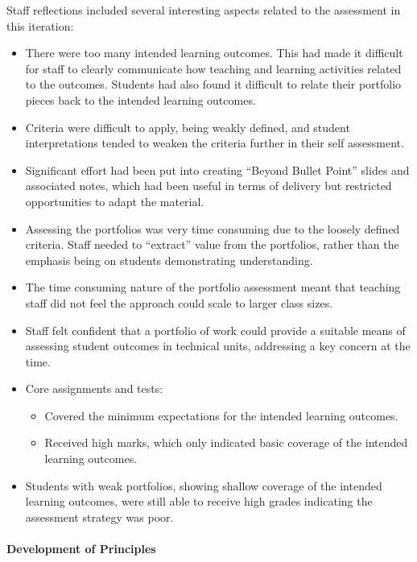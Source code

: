 Staff reflections included several interesting aspects related to the assessment in this iteration:
\begin{itemize}[noitemsep,nolistsep]
  \item There were too many intended learning outcomes. This had made it difficult for staff to clearly communicate how teaching and learning activities related to the outcomes. Students had also found it difficult to relate their portfolio pieces back to the intended learning outcomes.
  \item Criteria were difficult to apply, being weakly defined, and student interpretations tended to weaken the criteria further in their self assessment.
  \item Significant effort had been put into creating ``Beyond Bullet Point'' slides and associated notes, which had been useful in terms of delivery but restricted opportunities to adapt the material.
  \item Assessing the portfolios was very time consuming due to the loosely defined criteria. Staff needed to ``extract'' value from the portfolios, rather than the emphasis being on students demonstrating understanding.
  \item The time consuming nature of the portfolio assessment meant that teaching staff did not feel the approach could scale to larger class sizes.
  \item Staff felt confident that a portfolio of work could provide a suitable means of assessing student outcomes in technical units, addressing a key concern at the time.
  \item Core assignments and tests:
  \begin{itemize}[noitemsep,nolistsep]
    \item Covered the minimum expectations for the intended learning outcomes.
    \item Received high marks, which only indicated basic coverage of the intended learning outcomes. 
  \end{itemize}
  \item Students with weak portfolios, showing shallow coverage of the intended learning outcomes, were still able to receive high grades indicating the assessment strategy was poor.
\end{itemize}


\paragraph{Development of Principles} %

